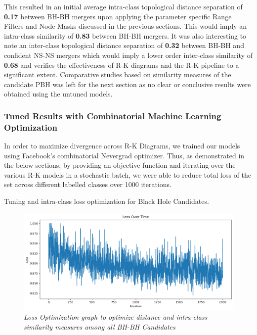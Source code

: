 This resulted in an initial average intra-class topological distance separation of \textbf{0.17} between BH-BH mergers upon applying the parameter specific Range Filters and Node Masks discussed in the previous sections. This would imply an intra-class similarity of \textbf{0.83} between BH-BH mergers. It was also interesting to note an inter-class topological distance separation of \textbf{0.32} between BH-BH and confident NS-NS mergers which would imply a lower order inter-class similarity of \textbf{0.68} and verifies the effectiveness of R-K diagrams and the R-K pipeline to a significant extent. Comparative studies based on similarity measures of the candidate PBH was left for the next section as no clear or conclusive results were obtained using the untuned  models. 


\subsubsection{Tuned Results with Combinatorial Machine Learning Optimization}

In order to maximize divergence across R-K Diagrams, we trained our models using Facebook's combinatorial Nevergrad \cite{a2020_nevergrad} optimizer. Thus, as demonstrated in the below sections, by providing an objective function and iterating over the various R-K models in a stochastic batch, we were able to reduce total loss of the set across different labelled classes over 1000 iterations.

Tuning and intra-class loss optimization for Black Hole Candidates. 

\begin{figure}[H]
        \centering
 	\includegraphics[width=1.0\linewidth]{images/IntraClass_Tuning&Loss_ForBHs.png}
 	\caption{\textit{Loss Optimization graph to optimize distance and intra-class similarity measures among all BH-BH Candidates}}
 	\label{fig:intra-class_BH_Loss}
\end{figure}

